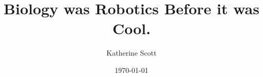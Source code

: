 \documentclass[compress]{beamer}
\title[BioBots]{Biology was Robotics Before it was Cool.} %
\author{Katherine Scott} %
\institute[@kscottz] %
{
Computer Vision Engineer
\medskip
\textit{katherine.a.scott@gmail.com}
\textit{http://www.kscottz.com}
}
\date{\today} %
\begin{document}
\begin{frame}
\titlepage %
\end{frame}



\end{document}
